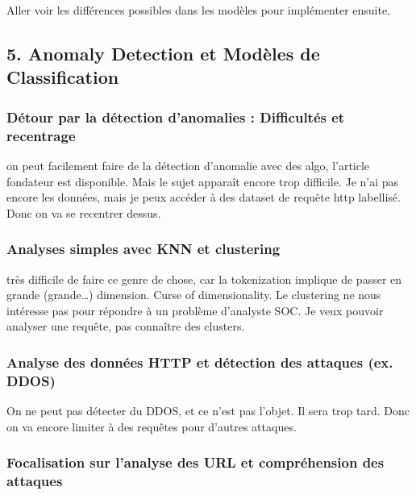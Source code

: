 \documentclass[
  letterpaper,
  DIV=11,
  numbers=noendperiod]{scrartcl}
\begin{document}
Aller voir les différences possibles dans les modèles pour implémenter
ensuite.

\subsection{5. Anomaly Detection et Modèles de
Classification}\label{anomaly-detection-et-moduxe8les-de-classification}

\subsubsection{Détour par la détection d'anomalies : Difficultés et
recentrage}\label{duxe9tour-par-la-duxe9tection-danomalies-difficultuxe9s-et-recentrage}

on peut facilement faire de la détection d'anomalie avec des algo,
l'article fondateur est disponible. Mais le sujet apparaît encore trop
difficile. Je n'ai pas encore les données, mais je peux accéder à des
dataset de requête http labellisé. Donc on va se recentrer dessus.

\subsubsection{Analyses simples avec KNN et
clustering}\label{analyses-simples-avec-knn-et-clustering}

très difficile de faire ce genre de chose, car la tokenization implique
de passer en grande (grande\ldots) dimension. Curse of dimensionality.
Le clustering ne nous intéresse pas pour répondre à un problème
d'analyste SOC. Je veux pouvoir analyser une requête, pas connaître des
clusters.

\subsubsection{Analyse des données HTTP et détection des attaques (ex.
DDOS)}\label{analyse-des-donnuxe9es-http-et-duxe9tection-des-attaques-ex.-ddos}

On ne peut pas détecter du DDOS, et ce n'est pas l'objet. Il sera trop
tard. Donc on va encore limiter à des requêtes pour d'autres attaques.

\subsubsection{Focalisation sur l'analyse des URL et compréhension des
attaques}\label{focalisation-sur-lanalyse-des-url-et-compruxe9hension-des-attaques}
\end{document}

